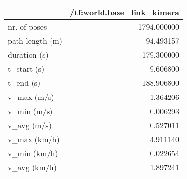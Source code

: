 \begin{tabular}{lr}
\toprule
{} &  /tf:world.base\_link\_kimera \\
\midrule
nr. of poses    &                 1794.000000 \\
path length (m) &                   94.493157 \\
duration (s)    &                  179.300000 \\
t\_start (s)     &                    9.606800 \\
t\_end (s)       &                  188.906800 \\
v\_max (m/s)     &                    1.364206 \\
v\_min (m/s)     &                    0.006293 \\
v\_avg (m/s)     &                    0.527011 \\
v\_max (km/h)    &                    4.911140 \\
v\_min (km/h)    &                    0.022654 \\
v\_avg (km/h)    &                    1.897241 \\
\bottomrule
\end{tabular}
